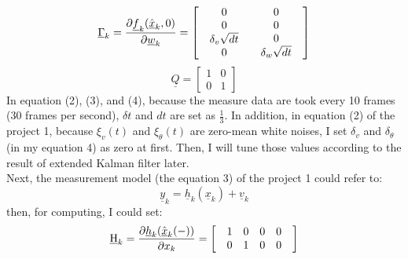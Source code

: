 \documentclass{article}
\begin{document}
\begin{equation}
	\underline{\Gamma}_k  = \frac{{\partial \underline{f}_k (\hat{\underline{x}}_k ,0)}}{{\partial \underline{w}_k }} = \left[ {\begin{array}{*{20}c}
	   {\begin{array}{*{20}c}
	   0  \\
	   0  \\
	   {\delta _v \sqrt {dt} }  \\
	   0  \\
	\end{array}} & {\begin{array}{*{20}c}
	   0  \\
	   0  \\
	   0  \\
	   {\delta _w \sqrt {dt} }  \\
	\end{array}}  \\
	\end{array}} \right]
\end{equation}
\begin{equation}
\underline{Q}=\left[ \begin{array}{cc}
1 & 0 \\ 
0 & 1
\end{array}\right]  
\end{equation}
In equation (2), (3), and (4), because the measure data are took every 10 frames (30 frames per second), 
$\delta t$ and $dt$ are set as $\frac{1}{3}$. In addition, in equation (2) of the project 1, because $\xi_v (t)$ 
and $\xi_\theta (t)$ are zero-mean white noises, I set $\delta_v$ and $\delta_\theta$ (in my equation 4) as 
zero at first. Then, I will tune those values according to the result of extended Kalman filter later.\\ 
Next, the measurement model (the equation 3) of the project 1 could refer to:
\begin{equation}
	\underline{y}_k = \underline{h}_k(\underline{x}_k) + \underline{v}_k
\end{equation}
then, for computing, I could set:
\begin{equation}
	\underline{{\rm H}}_k  = \frac{{\partial \underline{h}_k (\hat{\underline{x}}_k (-))}}{{\partial x_k }} = \left[ {\begin{array}{*{20}c}
	   {\begin{array}{*{20}c}
	   1 & 0 & 0 & 0  \\
	\end{array}}  \\
	   {\begin{array}{*{20}c}
	   0 & 1 & 0 & 0  \\
	\end{array}}  \\
	\end{array}} \right]
\end{equation}
\end{document}
